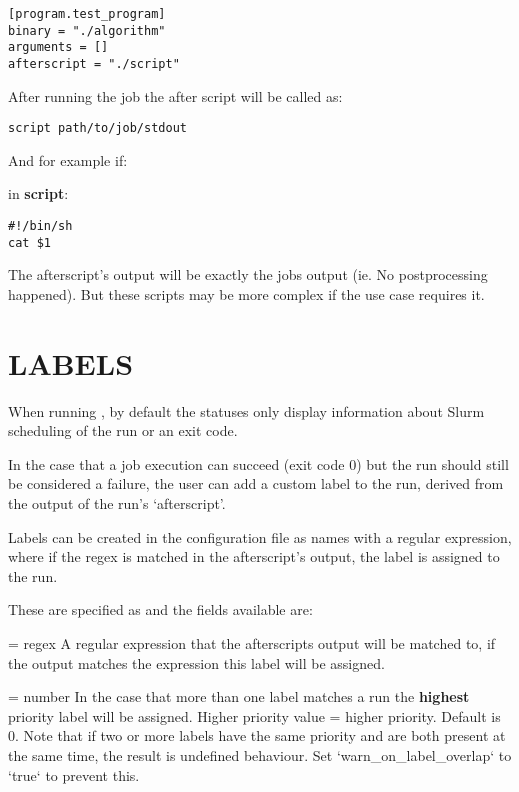 \documentclass[a4paper,english]{article}
\begin{document}
\begin{adjustwidth}{18pt}{0pt}
            \begin{verbatim}
[program.test_program]
binary = "./algorithm"
arguments = []
afterscript = "./script"
            \end{verbatim}

            After running the job the after script will be called as:

            \begin{verbatim}
script path/to/job/stdout
            \end{verbatim}

            And for example if:

            in \textbf{script}:
            \begin{verbatim}
#!/bin/sh
cat $1
            \end{verbatim}

            The afterscript's output will be exactly the jobs output (ie. No postprocessing happened).
            But these scripts may be more complex if the use case requires it.

    \section{LABELS}

      When running  , by default the statuses only display information
      about Slurm scheduling of the run or an exit code.

      In the case that a job execution can succeed (exit code 0) but the run should still
      be considered a failure, the user can add a custom label to the run, derived from
      the output of the run's `afterscript'.

      Labels can be created in the configuration file as names with a regular expression,
      where if the regex is matched in the afterscript's output, the label is assigned to the run.

      These are specified as  and the fields available are:

      \begin{Description}[Options]\setlength{\itemsep}{0cm}
          \item[\Opt{regex} = regex]
          A regular expression that the afterscripts output will be matched to,
          if the output matches the expression this label will be assigned.

          \item[\Opt{priority} = number]
          In the case that more than one label matches a run the \textbf{highest}
          priority label will be assigned.
          Higher priority value = higher priority.
          Default is 0. 
          Note that if two or more labels have the same priority and are both present 
          at the same time, the result is undefined behaviour. 
          Set `warn\_on\_label\_overlap` to `true` to prevent this.


\end{Description}
\end{adjustwidth}
\end{document}
